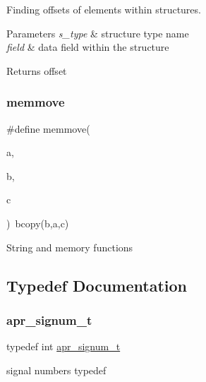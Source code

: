 Finding offsets of elements within structures. 
\begin{DoxyParams}{Parameters}
{\em s\+\_\+type} & structure type name \\
\hline
{\em field} & data field within the structure \\
\hline
\end{DoxyParams}
\begin{DoxyReturn}{Returns}
offset 
\end{DoxyReturn}
\mbox{\label{group__apr__general_gad12df83f1d3a090b658adc645555ca79}} 
\subsubsection{\texorpdfstring{memmove}{memmove}}
{\footnotesize\ttfamily \#define memmove(\begin{DoxyParamCaption}\item[{}]{a,  }\item[{}]{b,  }\item[{}]{c }\end{DoxyParamCaption})~bcopy(b,a,c)}

String and memory functions 

\subsection{Typedef Documentation}
\mbox{\label{group__apr__general_gafe9e657d61b61d62ecba34299a82a7ea}} 
\subsubsection{\texorpdfstring{apr\+\_\+signum\+\_\+t}{apr\_signum\_t}}
{\footnotesize\ttfamily typedef int \mbox{\hyperlink{group__apr__general_gafe9e657d61b61d62ecba34299a82a7ea}{apr\+\_\+signum\+\_\+t}}}

signal numbers typedef 